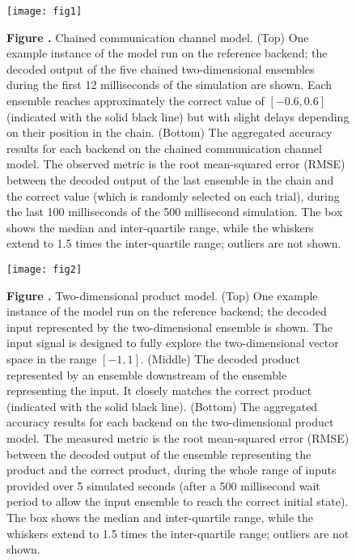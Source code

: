 \documentclass{frontiersSCNS}
\begin{document}



\begin{figure}[!ht]
\begin{center}
  \texttt{[image: fig1]}
\end{center}
\textbf{\label{fig:01} Figure .}
       {Chained communication channel model. (Top) One example instance
         of the model run on the reference backend; the decoded output
         of the five chained two-dimensional ensembles during the first
         12 milliseconds of the simulation are shown.
         Each ensemble reaches approximately the correct value of
         $[-0.6, 0.6]$ (indicated with the solid black line)
         but with slight delays depending on their position in the chain.
         (Bottom) The aggregated accuracy results for each backend on the
         chained communication channel model. The observed metric is the root
         mean-squared error (RMSE) between the decoded output of the last
         ensemble in the chain and the correct value (which is randomly
         selected on each trial), during the last 100 milliseconds of the
         500 millisecond simulation. The box shows the median and
         inter-quartile range, while the whiskers extend to 1.5 times the
         inter-quartile range; outliers are not shown.}
\end{figure}

\begin{figure}[!ht]
\begin{center}
  \texttt{[image: fig2]}
\end{center}
\textbf{\label{fig:02} Figure .}
       {Two-dimensional product model. (Top) One example instance of the model
         run on the reference backend; the decoded input represented
         by the two-dimensional ensemble is shown. The input signal is
         designed to fully explore the two-dimensional vector space
         in the range $[-1, 1]$.
         (Middle) The decoded product represented by an ensemble downstream
         of the ensemble representing the input. It closely matches the
         correct product (indicated with the solid black line).
         (Bottom) The aggregated accuracy results for each backend on the
         two-dimensional product model. The measured metric is the root
         mean-squared error (RMSE) between the decoded output of the ensemble
         representing the product and the correct product, during the whole
         range of inputs provided over 5 simulated seconds (after a 500
         millisecond wait period to allow the input ensemble to reach the
         correct initial state). The box shows the median and
         inter-quartile range, while the whiskers extend to 1.5 times the
         inter-quartile range; outliers are not shown.}
\end{figure}
\end{document}
